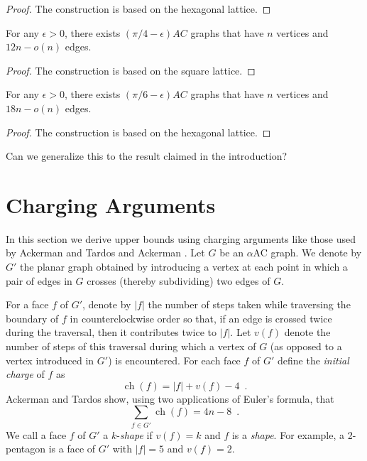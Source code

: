 \documentclass[lotsofwhite,charterfonts]{patmorin}
\DeclareMathOperator{\ch}{ch}
\begin{document}
\begin{proof}
The construction is based on the hexagonal lattice.
\end{proof}

\begin{thm}
For any $\epsilon > 0$, there exists
$(\pi/4-\epsilon)AC$ graphs that have $n$ vertices and $12n- o(n)$ edges.
\end{thm}

\begin{proof}
The construction is based on the square lattice.
\end{proof}

\begin{thm}
For any $\epsilon > 0$, there exists
$(\pi/6-\epsilon)AC$ graphs that have $n$ vertices and $18n- o(n)$ edges.
\end{thm}

\begin{proof}
The construction is based on the hexagonal lattice.
\end{proof}

Can we generalize this to the result claimed in the introduction?


\section{Charging Arguments}

In this section we derive upper bounds using charging arguments like those
used by Ackerman and Tardos \cite{atXX} and Ackerman \cite{atXX}.  Let $G$
be an $\alpha$AC graph.  We denote by $G'$ the planar graph obtained by
introducing a vertex at each point in which a pair of edges in $G$ crosses
(thereby subdividing) two edges of $G$.  

For a face $f$ of $G'$, denote by $|f|$ the number of steps taken while
traversing the boundary of $f$ in counterclockwise order so that, if an
edge is crossed twice during the traversal, then it contributes twice to
$|f|$.  Let $v(f)$ denote the number of steps of this traversal during
which a vertex of $G$ (as opposed to a vertex introduced in $G'$) is
encountered.  For each face $f$ of $G'$ define the \emph{initial charge} of
$f$ as
\[
    \ch(f) = |f| + v(f) - 4  \enspace .
\]
Ackerman and Tardos show, using two applications of Euler's formula, that
\[
    \sum_{f\in G'} \ch(f) = 4n-8 \enspace .
\]
We call a face $f$ of $G'$ a $k$-\emph{shape} if $v(f)=k$ and $f$ is a
\emph{shape}.  For example, a 2-pentagon is a face of $G'$ with $|f|=5$ and
$v(f)=2$.
\end{document}
